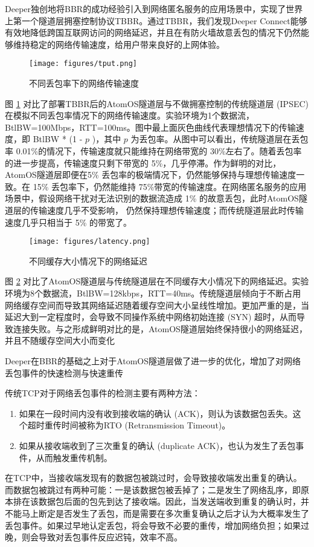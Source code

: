 \documentclass[a4paper]{article}
\begin{document}
Deeper独创地将BBR的成功经验引入到网络匿名服务的应用场景中，实现了世界上第一个隧道层拥塞控制协议TBBR。通过TBBR，我们发现Deeper Connect能够有效地降低跨国互联网访问的网络延迟，并且在有防火墙故意丢包的情况下仍然能够维持稳定的网络传输速度，给用户带来良好的上网体验。

\begin{figure}[hhhh]
\centering
\texttt{[image: figures/tput.png]}
\caption{不同丢包率下的网络传输速度}
\label{fig:tput}
\end{figure}

图 \ref{fig:tput} 对比了部署TBBR后的AtomOS隧道层与不做拥塞控制的传统隧道层
(IPSEC) 在模拟不同丢包率情况下的网络传输速度。实验环境为1个数据流，BtlBW=100Mbps，RTT=100ms。图中最上面灰色曲线代表理想情况下的传输速度，即 BtlBW * (1 - $p$ )，其中 $p$ 为丢包率。从图中可以看出，传统隧道层在丢包率 0.01\%的情况下，传输速度就只能维持在网络带宽的 30\%左右了。随着丢包率的进一步提高，传输速度只剩下带宽的 5\%，几乎停滞。作为鲜明的对比，AtomOS隧道层即便在5\% 丢包率的极端情况下，仍然能够保持与理想传输速度一致。在 15\% 丢包率下，仍然能维持 75\%带宽的传输速度。在网络匿名服务的应用场景中，假设网络干扰对无法识别的数据流造成 1\% 的故意丢包，此时AtomOS隧道层的传输速度几乎不受影响，
仍然保持理想传输速度；而传统隧道层此时传输速度几乎只相当于 5\% 的带宽了。

\begin{figure}[hhhh]
\centering
\texttt{[image: figures/latency.png]}
\caption{不同缓存大小情况下的网络延迟}
\label{fig:latency}
\end{figure}
图 \ref{fig:latency} 对比了AtomOS隧道层与传统隧道层在不同缓存大小情况下的网络延迟。实验环境为8个数据流，BtlBW=128kbps，RTT=40ms。传统隧道层倾向于不断占用网络缓存空间而导致其网络延迟随着缓存空间大小呈线性增加。更加严重的是，当延迟大到一定程度时，会导致不同操作系统中网络初始连接 (SYN) 超时，从而导致连接失败。与之形成鲜明对比的是，AtomOS隧道层始终保持很小的网络延迟，并且不随缓存空间大小而变化

Deeper在BBR的基础之上对于AtomOS隧道层做了进一步的优化，增加了对网络丢包事件的快速检测与快速重传

传统TCP对于网络丢包事件的检测主要有两种方法：
\begin{enumerate}
\item 如果在一段时间内没有收到接收端的确认 (ACK)，则认为该数据包丢失。这个超时重传时间被称为RTO (Retransmission Timeout)。
\item 如果从接收端收到了三次重复的确认 (duplicate ACK)，也认为发生了丢包事件，从而触发重传机制。
\end{enumerate}
在TCP中，当接收端发现有的数据包被跳过时，会导致接收端发出重复的确认。而数据包被跳过有两种可能：一是该数据包被丢掉了；二是发生了网络乱序，即原本排在该数据包后面的包先到达了接收端。因此，当发送端收到重复的确认时，并不能马上断定是否发生了丢包，而是需要在多次重复确认之后才认为大概率发生了丢包事件。如果过早地认定丢包，将会导致不必要的重传，增加网络负担；如果过晚，则会导致对丢包事件反应迟钝，效率不高。
\end{document}
